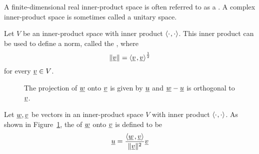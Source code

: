 A finite-dimensional real inner-product space is often referred to as a .
A complex inner-product space is sometimes called a unitary space.

\begin{definition}
Let $V$ be an inner-product space with inner product ${\langle  \cdot  \mskip1mu ,  \cdot  \rangle}$.
This inner product can be used to define a norm, called the , where
\begin{equation*}
\left\| \underline{v} \right\| = {\left\langle  \underline{v}  \mskip2mu ,  \underline{v}  \right\rangle}^{\frac{1}{2}}
\end{equation*}
for every $\underline{v} \in V$.
\end{definition}

\begin{figure}
\centering
{}
\caption{\label{fig:vector_projection}The projection of $\underline{w}$ onto $\underline{v}$ is given by $\underline{u}$ and $\underline{w}-\underline{u}$ is orthogonal to $\underline{v}$.}
\end{figure}

\begin{definition}
Let $\underline{w},\underline{v}$ be vectors in an inner-product space $V$ with inner product ${\langle  \cdot  \mskip1mu ,  \cdot  \rangle}$.
As shown in Figure~\ref{fig:vector_projection}, the  of $\underline{w}$ onto $\underline{v}$ is defined to be
\begin{equation*}
\underline{u} = \frac{{\left\langle  \underline{w}  \mskip2mu ,  \underline{v}  \right\rangle}}{\|\underline{v}\|^2} \underline{v}
\end{equation*}
\end{definition}

